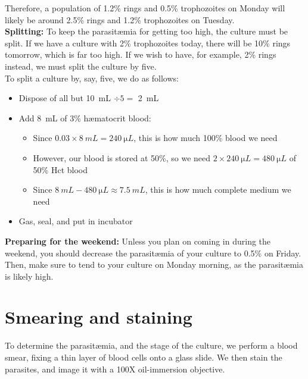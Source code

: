\documentclass{article}
\begin{document}
Therefore, a population of 1.2\% rings and 0.5\% trophozoites on Monday will likely be around 2.5\% rings and 1.2\% trophozoites on Tuesday.\\

\textbf{Splitting:}
To keep the parasit{\ae}mia for getting too high, the culture must be split. If we have a culture with 2\% trophozoites today, there will be 10\% rings tomorrow, which is far too high. If we wish to have, for example, 2\% rings instead, we must split the culture by five.\\

To split a culture by, say, five, we do as follows:

\begin{itemize}
	\item Dispose of all but \SI{10}{mL} $\div 5 = $ \SI{2}{mL}
	\item Add \SI{8}{mL} of 3\% h{\ae}matocrit blood:
	\begin{itemize}
		\item Since $0.03 \times \SI{8}{mL} = \SI{240}{\micro L}$, this is how much 100\% blood we need
		\item However, our blood is stored at 50\%, so we need $2 \times \SI{240}{\micro L} = \SI{480}{\micro L}$ of 50\% Hct blood
		\item Since $\SI{8}{mL} - \SI{480}{\micro L} \approx \SI{7.5}{mL}$, this is how much complete medium we need
	\end{itemize}
	\item Gas, seal, and put in incubator
\end{itemize}

\textbf{Preparing for the weekend:}
Unless you plan on coming in during the weekend, you should decrease the parasit{\ae}mia of your culture to 0.5\% on Friday. Then, make sure to tend to your culture on Monday morning, as the parasit{\ae}mia is likely high.

\newpage

\section{Smearing and staining}

To determine the parasit{\ae}mia, and the stage of the culture, we perform a blood smear, fixing a thin layer of blood cells onto a glass slide. We then stain the parasites, and image it with a 100X oil-immersion objective.
\end{document}

